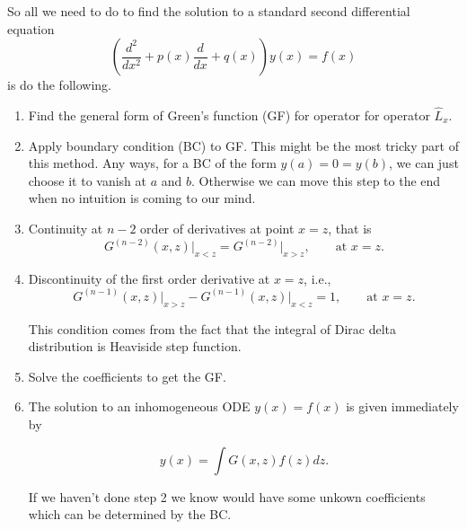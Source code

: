 \begin{framed}
So all we need to do to find the solution to a standard second differential equation
\begin{equation*}
    \left( \frac{d^2}{dx^2} + p(x) \frac{d}{dx} + q(x) \right)y(x) = f(x)
\end{equation*}
is do the following.

\begin{enumerate}
\item 
    Find the general form of Green's function (GF) for operator for operator $\hat L_x$.
\item
Apply boundary condition (BC) to GF. This might be the most tricky part of this method. Any ways, for a BC of the form $y(a)=0=y(b)$, we can just choose it to vanish at $a$ and $b$. Otherwise we can move this step to the end when no intuition is coming to our mind.
\item 
Continuity at $n-2$ order of derivatives at point $x=z$, that is
\begin{equation*}
    G^{(n-2)}(x,z) \vert_{x<z} = G^{(n-2)} \vert _{x>z} ,\qquad \text{at } x= z.
\end{equation*}
    
    
\item
Discontinuity of the first order derivative at $x=z$, i.e., 
\begin{equation*}
    G^{(n-1)}(x,z)\vert_{x>z} - G^{(n-1)}(x,z)\vert_{x<z} = 1, \qquad \text{at } x= z.
\end{equation*}

This condition comes from the fact that the integral of Dirac delta distribution is Heaviside step function.

\item
Solve the coefficients to get the GF.

\item
The solution to an inhomogeneous ODE  $y(x)=f(x)$ is given immediately by

\begin{equation*}
    y(x) = \int G(x,z) f(z) dz.
\end{equation*}

If we haven't done step 2 we know would have some unkown coefficients which can be determined by the BC.

\end{enumerate}


\end{framed}




